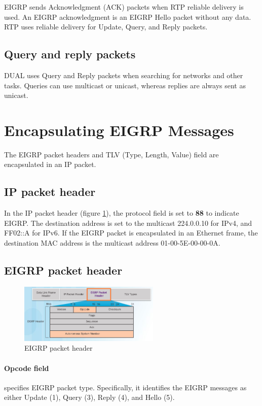 EIGRP sends Acknowledgment (ACK) packets when RTP reliable delivery is used. An EIGRP acknowledgment is an EIGRP Hello packet without any data. RTP uses reliable delivery for Update, Query, and Reply packets.

\subsection{Query and reply packets}

DUAL uses Query and Reply packets when searching for networks and other tasks. Queries can use multicast or unicast, whereas replies are always sent as unicast.

\section{Encapsulating EIGRP Messages}
The EIGRP packet headers and TLV (Type, Length, Value) field are encapsulated in an IP packet.

\subsection{IP packet header}

In the IP packet header (figure \ref{EIGRP-packet-header}), the protocol field is set to \textbf{88} to indicate EIGRP. The destination address is set to the multicast 224.0.0.10 for IPv4, and FF02::A for IPv6. If the EIGRP packet is encapsulated in an Ethernet frame, the destination MAC address is the multicast address 01-00-5E-00-00-0A.

\subsection{EIGRP packet header}

\begin{figure}[hbtp]
\centering
\includegraphics[width=0.6\textwidth]{pictures/EIGRP-packet-header.png}
\caption{EIGRP packet header} \label{EIGRP-packet-header}
\end{figure}

\paragraph{Opcode field} specifies EIGRP packet type. Specifically, it identifies the EIGRP messages as either Update (1), Query (3), Reply (4), and Hello (5).\\
 
